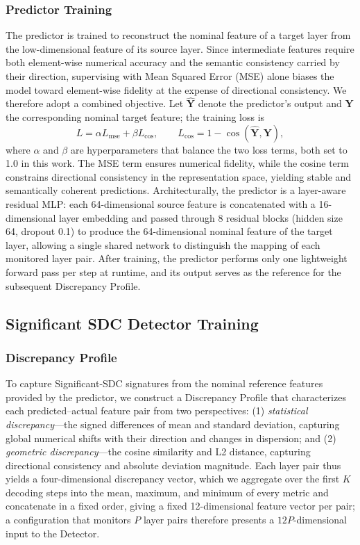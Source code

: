 \subsubsection{Predictor Training}
The predictor is trained to reconstruct the nominal feature of a target layer from the low-dimensional feature of its source layer. Since intermediate features require both element-wise numerical accuracy and the semantic consistency carried by their direction, supervising with Mean Squared Error (MSE) alone biases the model toward element-wise fidelity at the expense of directional consistency. We therefore adopt a combined objective. Let $\hat{\mathbf{Y}}$ denote the predictor's output and $\mathbf{Y}$ the corresponding nominal target feature; the training loss is
$$L = \alpha L_{\mathrm{mse}} + \beta L_{\mathrm{cos}}, \qquad L_{\mathrm{cos}} = 1 - \cos(\hat{\mathbf{Y}}, \mathbf{Y}),$$
where $\alpha$ and $\beta$ are hyperparameters that balance the two loss terms, both set to 1.0 in this work. The MSE term ensures numerical fidelity, while the cosine term constrains directional consistency in the representation space, yielding stable and semantically coherent predictions. Architecturally, the predictor is a layer-aware residual MLP: each 64-dimensional source feature is concatenated with a 16-dimensional layer embedding and passed through 8 residual blocks (hidden size 64, dropout 0.1) to produce the 64-dimensional nominal feature of the target layer, allowing a single shared network to distinguish the mapping of each monitored layer pair. After training, the predictor performs only one lightweight forward pass per step at runtime, and its output serves as the reference for the subsequent Discrepancy Profile.

\subsection{Significant SDC Detector Training}

\subsubsection{Discrepancy Profile}
To capture Significant-SDC signatures from the nominal reference features provided by the predictor, we construct a Discrepancy Profile that characterizes each predicted--actual feature pair from two perspectives: (1) \emph{statistical discrepancy}---the signed differences of mean and standard deviation, capturing global numerical shifts with their direction and changes in dispersion; and (2) \emph{geometric discrepancy}---the cosine similarity and L2 distance, capturing directional consistency and absolute deviation magnitude. Each layer pair thus yields a four-dimensional discrepancy vector, which we aggregate over the first $K$ decoding steps into the mean, maximum, and minimum of every metric and concatenate in a fixed order, giving a fixed 12-dimensional feature vector per pair; a configuration that monitors $P$ layer pairs therefore presents a $12P$-dimensional input to the Detector.

